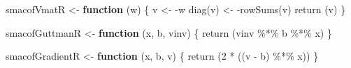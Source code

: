 \documentclass[
  12pt,
  letterpaper,
  DIV=11,
  numbers=noendperiod]{scrreprt}
\newenvironment{Shaded}{\begin{snugshade}}{\end{snugshade}}
\newcommand{\ControlFlowTok}[1]{\textcolor[rgb]{0.00,0.23,0.31}{\textbf{#1}}}
\newcommand{\DecValTok}[1]{\textcolor[rgb]{0.68,0.00,0.00}{#1}}
\newcommand{\FunctionTok}[1]{\textcolor[rgb]{0.28,0.35,0.67}{#1}}
\newcommand{\NormalTok}[1]{\textcolor[rgb]{0.00,0.23,0.31}{#1}}
\newcommand{\OtherTok}[1]{\textcolor[rgb]{0.00,0.23,0.31}{#1}}
\newcommand{\SpecialCharTok}[1]{\textcolor[rgb]{0.37,0.37,0.37}{#1}}
\theoremstyle{remark}
\begin{document}
\begin{Shaded}
\begin{Highlighting}[]
\NormalTok{smacofVmatR }\OtherTok{\textless{}{-}} \ControlFlowTok{function}\NormalTok{ (w) \{}
\NormalTok{  v }\OtherTok{\textless{}{-}} \SpecialCharTok{{-}}\NormalTok{w}
  \FunctionTok{diag}\NormalTok{(v) }\OtherTok{\textless{}{-}} \SpecialCharTok{{-}}\FunctionTok{rowSums}\NormalTok{(v)}
  \FunctionTok{return}\NormalTok{ (v)}
\NormalTok{\}}

\NormalTok{smacofGuttmanR }\OtherTok{\textless{}{-}} \ControlFlowTok{function}\NormalTok{ (x, b, vinv) \{}
  \FunctionTok{return}\NormalTok{ (vinv }\SpecialCharTok{\%*\%}\NormalTok{ b }\SpecialCharTok{\%*\%}\NormalTok{ x)}
\NormalTok{\}}

\NormalTok{smacofGradientR }\OtherTok{\textless{}{-}} \ControlFlowTok{function}\NormalTok{ (x, b, v) \{}
  \FunctionTok{return}\NormalTok{ (}\DecValTok{2} \SpecialCharTok{*}\NormalTok{ ((v }\SpecialCharTok{{-}}\NormalTok{ b) }\SpecialCharTok{\%*\%}\NormalTok{ x))}
\NormalTok{\}}


\end{Highlighting}
\end{Shaded}
\end{document}

